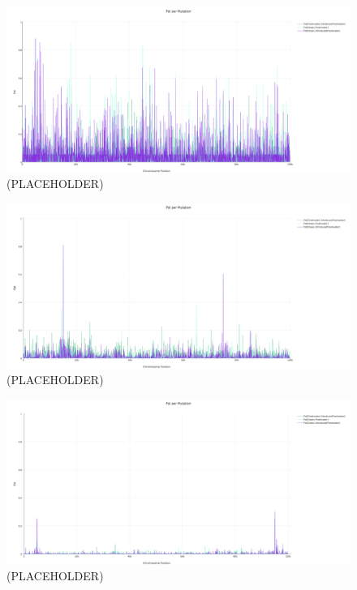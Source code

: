 \documentclass{article}
\begin{document}
\begin{figure}[h!tb]
	\begin{center}
  		\includegraphics[width=0.7\linewidth]{plotlyPlots/FstAcross5e-4.png}
  		\caption{(PLACEHOLDER)
		}
  		\label{fig:Fst2}
	\end{center}
\end{figure}

\begin{figure}[h!tb]
	\begin{center}
  		\includegraphics[width=0.7\linewidth]{plotlyPlots/FstAcross5e-3.png}
  		\caption{(PLACEHOLDER)
		}
  		\label{fig:Fst3}
	\end{center}
\end{figure}

\begin{figure}[h!tb]
	\begin{center}
  		\includegraphics[width=0.7\linewidth]{plotlyPlots/FstAcross5e-2.png}
  		\caption{(PLACEHOLDER)
		}
  		\label{fig:Fst4}
	\end{center}
\end{figure}
\end{document}
